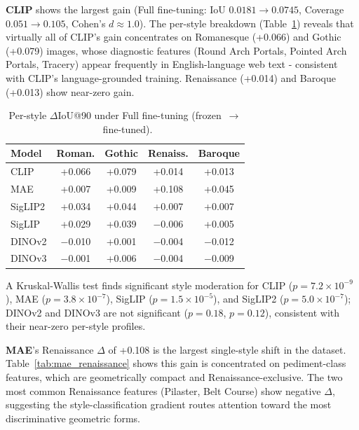 \documentclass[lineno,pdflatex,sn-mathphys-num]{sn-jnl}%
\theoremstyle{thmstyleone}%
\theoremstyle{thmstyletwo}%
\theoremstyle{thmstylethree}%
\begin{document}
\textbf{CLIP} shows the largest gain (Full fine-tuning: IoU $0.0181\!\to\!0.0745$,
Coverage $0.051\!\to\!0.105$, Cohen's $d\!\approx\!1.0$). The per-style
breakdown (Table~\ref{tab:perstyle}) reveals that virtually all of CLIP's gain
concentrates on Romanesque (+0.066) and Gothic (+0.079) images, whose diagnostic
features (Round Arch Portals, Pointed Arch Portals, Tracery) appear frequently
in English-language web text - consistent with CLIP's language-grounded training.
Renaissance (+0.014) and Baroque (+0.013) show near-zero gain.

\begin{table}[h]
\centering
\caption{Per-style $\Delta$IoU@90 under Full fine-tuning (frozen~$\to$~fine-tuned).}
\label{tab:perstyle}
\begin{tabular}{lcccc}
\toprule
Model & Roman. & Gothic & Renaiss. & Baroque \\
\midrule
CLIP    & +0.066 & +0.079 & +0.014 & +0.013 \\
MAE     & +0.007 & +0.009 & +0.108 & +0.045 \\
SigLIP2 & +0.034 & +0.044 & +0.007 & +0.007 \\
SigLIP  & +0.029 & +0.039 & $-$0.006 & +0.005 \\
DINOv2  & $-$0.010 & +0.001 & $-$0.004 & $-$0.012 \\
DINOv3  & $-$0.001 & +0.006 & $-$0.004 & $-$0.009 \\
\bottomrule
\end{tabular}
\end{table}

A Kruskal-Wallis test finds significant style moderation for CLIP
($p\!=\!7.2\!\times\!10^{-9}$), MAE ($p\!=\!3.8\!\times\!10^{-7}$), SigLIP
($p\!=\!1.5\!\times\!10^{-5}$), and SigLIP2 ($p\!=\!5.0\!\times\!10^{-7}$);
DINOv2 and DINOv3 are not significant ($p\!=\!0.18$, $p\!=\!0.12$), consistent
with their near-zero per-style profiles.

\textbf{MAE}'s Renaissance $\Delta$ of +0.108 is the largest single-style shift
in the dataset. Table~\ref{tab:mae_renaissance} shows this gain is concentrated
on pediment-class features, which are geometrically compact and
Renaissance-exclusive. The two most common Renaissance features (Pilaster,
Belt Course) show negative $\Delta$, suggesting the style-classification gradient
routes attention toward the most discriminative geometric forms.
\end{document}
